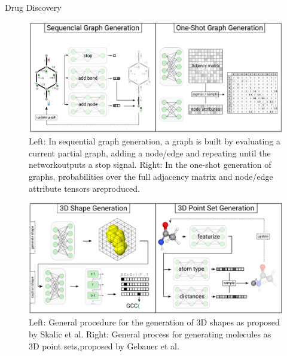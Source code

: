 \begin{frame}[allowframebreaks]{Drug Discovery}
    \framebreak
    
    \begin{figure}
        \centering
        \includegraphics[height=0.65\textheight,width=1\textwidth,keepaspectratio]{images/science/drug-discovery-seq-graph.png}
        \caption*{Left: In sequential graph generation, a graph is built by evaluating a current partial graph, adding a node/edge and repeating until the networkoutputs a stop signal. Right: In the one-shot generation of graphs, probabilities over the full adjacency matrix and node/edge attribute tensors areproduced.}
    \end{figure}

    \framebreak
    
    \begin{figure}
        \centering
        \includegraphics[height=0.65\textheight,width=1\textwidth,keepaspectratio]{images/science/drug-discovery-3d-shape-gen.png}
        \caption*{Left: General procedure for the generation of 3D shapes as proposed by Skalic et al. Right: General process for generating molecules as 3D point sets,proposed by Gebauer et al.}
    \end{figure}

    \framebreak
    

\end{frame}
